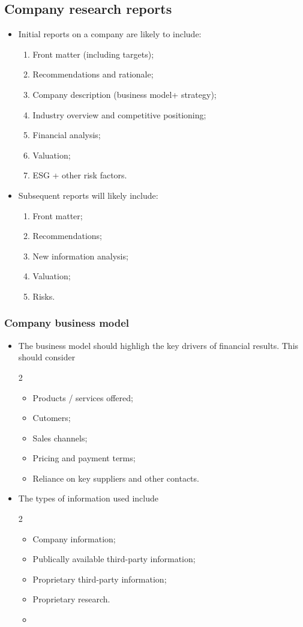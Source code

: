 \documentclass[../notes_compiled.tex]{subfiles}
\begin{document}
\subsection{Company research reports}
\begin{itemize}
\item Initial reports on a company are likely to include:
\begin{enumerate}
\item Front matter (including targets);
\item Recommendations and rationale;
\item Company description (business model+ strategy);
\item Industry overview and competitive positioning;
\item Financial analysis;
\item Valuation;
\item ESG + other risk factors.
\end{enumerate}
\item Subsequent reports will likely include:
\begin{enumerate}
\item Front matter;
\item Recommendations;
\item New information analysis;
\item Valuation;
\item Risks.
\end{enumerate}
\end{itemize}

\subsubsection{Company business model}
\begin{itemize}
\item The business model should highligh the key drivers of financial results. This should consider
\begin{multicols}{2}
\begin{itemize}
\item Products / services offered;
\item Cutomers;
\item Sales channels;
\item Pricing and payment terms;
\item Reliance on key suppliers and other contacts.
\end{itemize}
\end{multicols}
\item The types of information used include
\begin{multicols}{2}
\begin{itemize}
\item Company information;
\item Publically available third-party information;
\item Proprietary third-party information;
\item Proprietary research.
\item[]
\end{itemize}
\end{multicols}
\end{itemize}
\end{document}

